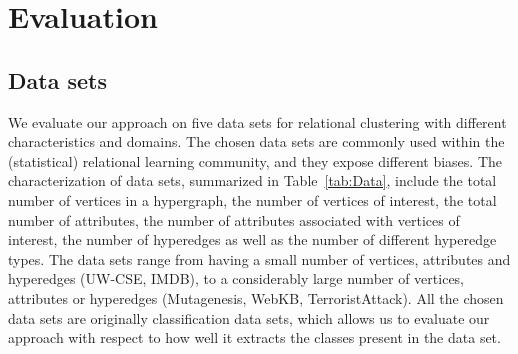 \section{Evaluation}
\label{sec:Evaluation}



\subsection{Data sets}



We evaluate our approach on five data sets for relational clustering with different characteristics and domains.
The chosen data sets are commonly used within the (statistical) relational learning community, and they expose different biases. 
The characterization of data sets, summarized in Table~\ref{tab:Data}, include the total number of vertices in a hypergraph, the number of vertices of interest, the total number of attributes, the number of attributes associated with vertices of interest, the number of hyperedges as well as the number of different hyperedge types.
The data sets range from having a small number of vertices, attributes and hyperedges (UW-CSE, IMDB), to a considerably large number of vertices, attributes or hyperedges (Mutagenesis, WebKB, TerroristAttack).
All the chosen data sets are originally classification data sets, which allows us to evaluate our approach with respect to how well it extracts the classes present in the data set.




